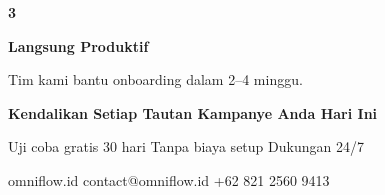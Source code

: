 \documentclass[a4paper]{article}
\begin{document}
\begin{center}
\begin{minipage}[t]{0.318\textwidth}
{\begin{minipage}{\dimexpr\linewidth-2\fboxsep\relax}
            \begin{center}
                {\fontsize{22}{26}\selectfont\bfseries\color{BluePrimary} 3}
            \end{center}
            \vspace{2pt}
            \begin{center}
                {\fontsize{10}{13}\selectfont\bfseries\color{BlueDark} Langsung Produktif}\par\vspace{3pt}
                {\fontsize{9}{12}\selectfont\color{TextDark} Tim kami bantu onboarding dalam 2--4 minggu.}
            \end{center}
            \vspace{6pt}
        \end{minipage}}
\end{minipage}
\end{center}

\vspace{8pt}

{\setlength{\fboxsep}{10pt}\setlength{\fboxrule}{0pt}%
\noindent\colorbox{BluePrimary}{%
    \begin{minipage}{\dimexpr\textwidth-2\fboxsep\relax}
        \centering
        {\fontsize{13}{16}\selectfont\bfseries\color{White}
        Kendalikan Setiap Tautan Kampanye Anda Hari Ini}\par\vspace{3pt}
        {\fontsize{9.5}{12}\selectfont\color{BlueMid}
        Uji coba gratis 30 hari \enspace\textbullet\enspace Tanpa biaya setup \enspace\textbullet\enspace Dukungan 24/7}\par\vspace{2pt}
        {\fontsize{9.5}{12}\selectfont\color{BlueLight}
        omniflow.id \enspace\textbullet\enspace contact@omniflow.id \enspace\textbullet\enspace +62 821 2560 9413}
    \end{minipage}}}

\restoregeometry
\pagestyle{empty}
\end{document}
